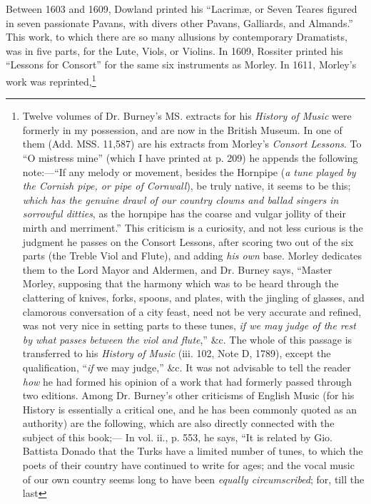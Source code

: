 Between 1603 and 1609, Dowland printed his “Lacrimæ, or Seven Teares
figured in seven passionate Pavans, with divers other Pavans, Galliards, and
Almands.” This work, to which there are so many allusions by contemporary
Dramatists, was in five parts, for the Lute, Viols, or Violins. In 1609, Rossiter
printed his “Lessons for Consort” for the same six instruments as Morley. In
1611, Morley’s work was reprinted,\footnote{\tinyrrr
Twelve volumes of Dr. Burney’s MS. extracts for his
\textit{History of Music} were formerly in my possession, and are
now in the British Museum. In one of them (Add. MSS.
11,587) are his extracts from Morley’s \textit{Consort Lessons}.
To “O mistress mine” (which I have printed at p. 209)
he appends the following note:—“If any melody or movement, 
besides the Hornpipe (\textit{a tune played by the Cornish
pipe, or pipe of Cornwall}), be truly native, it seems to be
this; \textit{which has the genuine drawl of our country clowns
and ballad singers in sorrowful ditties}, as the hornpipe has
the coarse and vulgar jollity of their mirth and merriment.” 
This criticism is a curiosity, and not less curious
is the judgment he passes on the Consort Lessons, after
scoring two out of the six parts (the Treble Viol and
Flute), and adding \textit{his own} base. Morley dedicates them
to the Lord Mayor and Aldermen, and Dr. Burney says,
“Master Morley, supposing that the harmony which was
to be heard through the clattering of knives, forks, spoons,
and plates, with the jingling of glasses, and clamorous
conversation of a city feast, need not be very accurate and
refined, was not very nice in setting parts to these tunes,
\textit{if we may judge of the rest by what passes between the viol
and flute},” \&c. The whole of this passage is transferred
to his \textit{History of Music} (iii. 102, Note D, 1789), except
the qualification, “\textit{if} we may judge,” \&c. It was not
advisable to tell the reader \textit{how} he had formed his opinion
of a work that had formerly passed through two editions.\linebreak
\indent Among Dr. Burney’s other criticisms of English Music
(for his History is essentially a critical one, and he has been
commonly quoted as an authority) are the following, which
are also directly connected with the subject of this book;—
In vol. ii., p. 553, he says, “It is related by Gio. Battista
Donado that the Turks have a limited number of tunes, to
which the poets of their country have continued to write
for ages; and the vocal music of our own country seems
long to have been \textit{equally circumscribed}; for, till the last
}
